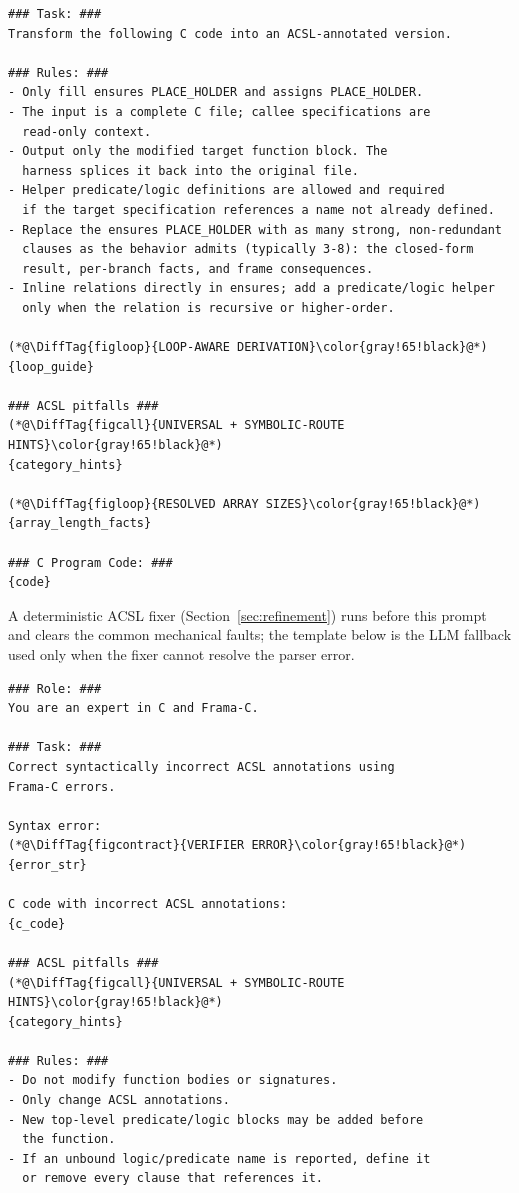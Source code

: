 
\begin{tcolorbox}[promptboxcompact, title={Postcondition / assignment generation prompt}]
\begin{lstlisting}[style=PromptInnerCompact]
### Task: ###
Transform the following C code into an ACSL-annotated version.

### Rules: ###
- Only fill ensures PLACE_HOLDER and assigns PLACE_HOLDER.
- The input is a complete C file; callee specifications are
  read-only context.
- Output only the modified target function block. The
  harness splices it back into the original file.
- Helper predicate/logic definitions are allowed and required
  if the target specification references a name not already defined.
- Replace the ensures PLACE_HOLDER with as many strong, non-redundant
  clauses as the behavior admits (typically 3-8): the closed-form
  result, per-branch facts, and frame consequences.
- Inline relations directly in ensures; add a predicate/logic helper
  only when the relation is recursive or higher-order.

(*@\DiffTag{figloop}{LOOP-AWARE DERIVATION}\color{gray!65!black}@*)
{loop_guide}

### ACSL pitfalls ###
(*@\DiffTag{figcall}{UNIVERSAL + SYMBOLIC-ROUTE HINTS}\color{gray!65!black}@*)
{category_hints}

(*@\DiffTag{figloop}{RESOLVED ARRAY SIZES}\color{gray!65!black}@*)
{array_length_facts}

### C Program Code: ###
{code}
\end{lstlisting}
\end{tcolorbox}


A deterministic ACSL fixer (Section~\ref{sec:refinement}) runs before this prompt and clears the common mechanical faults; the template below is the LLM fallback used only when the fixer cannot resolve the parser error.

\begin{tcolorbox}[promptboxcompact, title={Syntax-repair prompt}]
\begin{lstlisting}[style=PromptInnerCompact]
### Role: ###
You are an expert in C and Frama-C.

### Task: ###
Correct syntactically incorrect ACSL annotations using
Frama-C errors.

Syntax error:
(*@\DiffTag{figcontract}{VERIFIER ERROR}\color{gray!65!black}@*)
{error_str}

C code with incorrect ACSL annotations:
{c_code}

### ACSL pitfalls ###
(*@\DiffTag{figcall}{UNIVERSAL + SYMBOLIC-ROUTE HINTS}\color{gray!65!black}@*)
{category_hints}

### Rules: ###
- Do not modify function bodies or signatures.
- Only change ACSL annotations.
- New top-level predicate/logic blocks may be added before
  the function.
- If an unbound logic/predicate name is reported, define it
  or remove every clause that references it.
\end{lstlisting}
\end{tcolorbox}

